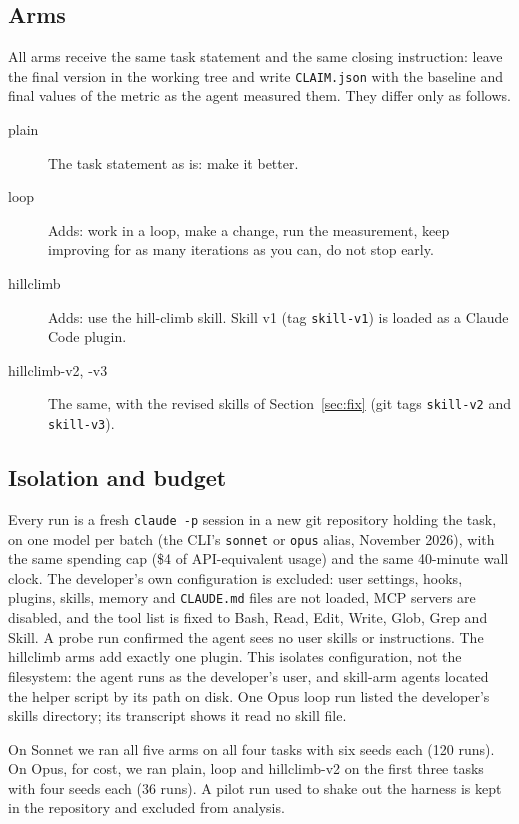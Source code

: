 \subsection{Arms}
All arms receive the same task statement and the same closing instruction: leave the final version in the
working tree and write \texttt{CLAIM.json} with the baseline and final values of the metric as the agent measured
them. They differ only as follows.

\begin{description}
\item[\textsf{plain}] The task statement as is: make it better.
\item[\textsf{loop}] Adds: work in a loop, make a change, run the measurement, keep improving for as many
  iterations as you can, do not stop early.
\item[\textsf{hillclimb}] Adds: use the hill-climb skill. Skill v1 (tag \texttt{skill-v1}) is loaded as a
  Claude Code plugin.
\item[\textsf{hillclimb-v2}, \textsf{-v3}] The same, with the revised skills of Section~\ref{sec:fix}
  (git tags \texttt{skill-v2} and \texttt{skill-v3}).
\end{description}

\subsection{Isolation and budget}
Every run is a fresh \texttt{claude -p} session in a new git repository holding the task, on one model per
batch (the CLI's \texttt{sonnet} or \texttt{opus} alias, November 2026), with the same spending cap (\$4 of API-equivalent usage) and the same 40-minute wall clock.
The developer's own configuration is excluded: user settings, hooks, plugins, skills, memory and
\texttt{CLAUDE.md} files are not loaded, MCP servers are disabled, and the tool list is fixed to Bash, Read, Edit,
Write, Glob, Grep and Skill. A probe run confirmed the agent sees no user skills or instructions. The
\textsf{hillclimb} arms add exactly one plugin. This isolates configuration, not the filesystem: the agent runs
as the developer's user, and skill-arm agents located the helper script by its path on disk. One Opus
\textsf{loop} run listed the developer's skills directory; its transcript shows it read no skill file.

On Sonnet we ran all five arms on all four tasks with six seeds each (120 runs). On Opus, for cost, we ran
\textsf{plain}, \textsf{loop} and \textsf{hillclimb-v2} on the first three tasks with four seeds each (36 runs).
A pilot run used to shake out the harness is kept in the repository and excluded from analysis.

